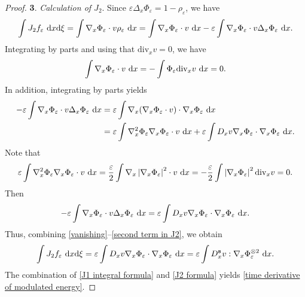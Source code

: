 \documentclass[11pt,reqno]{amsart}
\numberwithin{equation}{section}
\def\dd{{\rm d}}
\begin{document}
\begin{proof}
\smallskip
\textbf{3}.\textit{ Calculation of $J_{2}$}. Since $\varepsilon\Delta_{x} \Phi_{\varepsilon}=1-\rho_{\varepsilon}$, we have 
\begin{align*}
\int J_{2}f_{\varepsilon}\ \dd x\dd \xi=\int \nabla_{x}\Phi_{\varepsilon}\cdot v \rho_{\varepsilon}\ \dd x=\int\nabla_{x}\Phi_{\varepsilon}\cdot v\ \dd x-\varepsilon\int \nabla_{x}\Phi_{\varepsilon}\cdot v\Delta_{x} \Phi_{\varepsilon}\ \dd x.     
\end{align*}
Integrating by parts and using that $\mathrm{div}_{x}v=0$, we have
\begin{align}
\int \nabla_{x}\Phi_{\varepsilon}\cdot v\ \dd x=-\int \Phi_{\varepsilon}\mathrm{div}_{x}v\ \dd x=0.   \label{vanishing}  
\end{align}
In addition, integrating by parts yields  
\begin{align*}
-\varepsilon\int \nabla_{x}\Phi_{\varepsilon}\cdot v \Delta_{x} \Phi_{\varepsilon}\ \dd x&=\varepsilon\int \nabla_{x}(\nabla_{x} \Phi_{\varepsilon}\cdot v)\cdot \nabla_{x} \Phi_{\varepsilon}\ \dd x\\
&=\varepsilon\int \nabla^{2}_{x}\Phi_{\varepsilon}\nabla_{x} \Phi_{\varepsilon}\cdot v\ \dd x+\varepsilon\int D_{x}v\nabla_{x}\Phi_{\varepsilon}\cdot\nabla_{x}\Phi_{\varepsilon}\ \dd x.    
\end{align*}
Note that 
\begin{align*}
\varepsilon\int \nabla^{2}_{x}\Phi_{\varepsilon}\nabla_{x} \Phi_{\varepsilon}\cdot v\ \dd x=\frac{\varepsilon}{2}\int \nabla_{x}\left\vert \nabla_{x}\Phi_{\varepsilon}\right\vert^{2}\cdot v\ \dd x
=-\frac{\varepsilon}{2}\int\left\vert \nabla_{x}\Phi_{\varepsilon}\right\vert^{2}\mathrm{div}_{x}v =0.     
\end{align*}
Then
\begin{align}
-\varepsilon\int \nabla_{x}\Phi_{\varepsilon}\cdot v \Delta_{x} \Phi_{\varepsilon}\ \dd x=\varepsilon \int D_{x}v\nabla_{x}\Phi_{\varepsilon}\cdot \nabla_{x}\Phi_{\varepsilon}\ \dd x. \label{second term in J2}    
\end{align}
Thus, combining \eqref{vanishing}--\eqref{second term in J2},
we obtain
\begin{align}
\int J_{2}f_{\varepsilon}\ \dd x\dd \xi=\varepsilon\int D_{x}v\nabla_{x}\Phi_{\varepsilon}\cdot \nabla_{x} \Phi_{\varepsilon}\ \dd x=\varepsilon\int D^{\mathbf{s}}_{x}v:\nabla_{x} \Phi_{\varepsilon}^{\otimes 2}\ \dd x. \label{J2 formula} 
\end{align}
The combination of \eqref{J1 integral formula} and \eqref{J2 formula} yields \eqref{time derivative of modulated energy}.


\end{proof}
\end{document}

